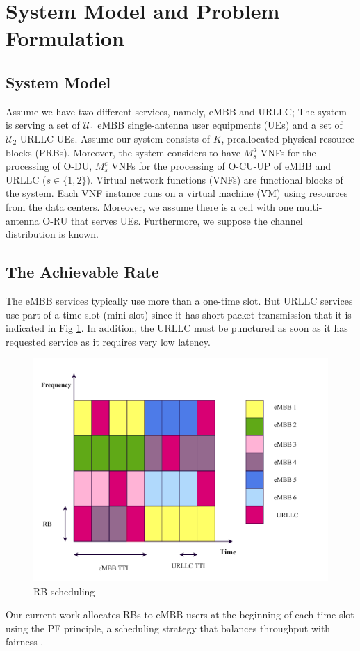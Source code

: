 \documentclass[conference]{IEEEtran}
\begin{document}
\section{System Model and Problem Formulation}
\subsection{System Model}
Assume we have two different services, namely, eMBB and URLLC; 
The system is serving a set of $\mathcal{U}_1$ eMBB single-antenna user equipments (UEs) and a set of $\mathcal{U}_2$ URLLC UEs.
Assume our system consists of $K$, preallocated physical resource blocks (PRBs). Moreover, the system considers to have $M_s^{d}$ VNFs for the processing of O-DU, $M_s^{c}$ VNFs for the processing of O-CU-UP of eMBB and URLLC ($ s \in \{1, 2\}$). 
Virtual network functions (VNFs) are functional blocks of the system. Each VNF instance runs on a virtual machine (VM) using resources from the data centers. 
Moreover, we assume there is a cell with one multi-antenna O-RU that serves UEs.
Furthermore, we suppose the channel distribution is known.
\subsection{The Achievable Rate}
The eMBB services typically use more than a one-time slot. But URLLC services use part of a time slot (mini-slot) since it has short packet transmission that it is indicated in Fig \ref{fig:2}. In addition, the URLLC must be punctured as soon as it has requested service as it requires very low latency.
\begin{figure}
  \centering 
    \includegraphics[scale = 0.4]{EU.pdf}
  \caption{RB scheduling}
  \label{fig:2}
\end{figure}
Our current work allocates RBs to eMBB users at the beginning of each time slot using the PF principle, a scheduling strategy that balances throughput with fairness \cite{shi2022risk}.
\end{document}
